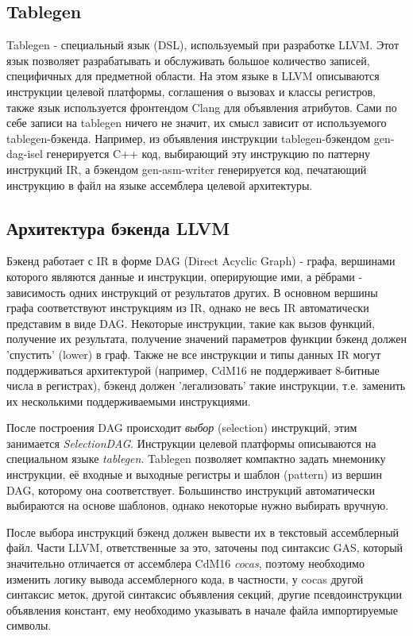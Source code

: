 \documentclass[a4paper,14pt]{extarticle}
\begin{document}
\subsection{Tablegen}
Tablegen - специальный язык (DSL), используемый при разработке LLVM. Этот язык позволяет разрабатывать и обслуживать большое количество записей, специфичных для предметной области. На этом языке в LLVM описываются инструкции целевой платформы, соглашения о вызовах и классы регистров, также язык используется фронтендом Clang для объявления атрибутов. Сами по себе записи на tablegen ничего не значит, их смысл зависит от используемого tablegen-бэкенда. Например, из объявления инструкции tablegen-бэкендом gen-dag-isel генерируется C++ код, выбирающий эту инструкцию по паттерну инструкций IR, а бэкендом gen-asm-writer генерируется код, печатающий инструкцию в файл на языке ассемблера целевой архитектуры\cite{llvm:tablegen}.

\subsection{Архитектура бэкенда LLVM}

Бэкенд работает с IR в форме DAG (Direct Acyclic Graph) - графа, вершинами которого являются данные и инструкции, оперирующие  ими, а рёбрами - зависимость одних инструкций от результатов других. В основном вершины графа соответствуют инструкциям из IR, однако не весь IR автоматически представим в виде DAG. Некоторые инструкции, такие как вызов функций, получение их результата, получение значений параметров функции бэкенд должен 'спустить' (lower) в граф. Также не все инструкции и типы данных IR могут поддерживаться архитектурой (например, CdM16 не поддерживает 8-битные числа в регистрах), бэкенд должен 'легализовать' такие инструкции, т.е. заменить их несколькими поддерживаемыми инструкциями.

После построения DAG происходит \emph{выбор} (selection) инструкций, этим занимается \emph{SelectionDAG}. Инструкции целевой платформы описываются на специальном языке \emph{tablegen}. Tablegen позволяет компактно задать мнемонику инструкции, её входные и выходные регистры и шаблон (pattern) из вершин DAG, которому она соответствует. Большинство инструкций автоматически выбираются на основе шаблонов, однако некоторые нужно выбирать вручную.

После выбора инструкций бэкенд должен вывести их в текстовый ассемблерный файл. Части LLVM, ответственные за это, заточены под синтаксис GAS, который значительно отличается от ассемблера CdM16 \emph{cocas}, поэтому  необходимо изменить логику вывода ассемблерного кода, в частности, у cocas другой синтаксис меток,  другой синтаксис объявления секций, другие псевдоинструкции объявления констант,  ему необходимо указывать в начале файла импортируемые символы.
\end{document}
